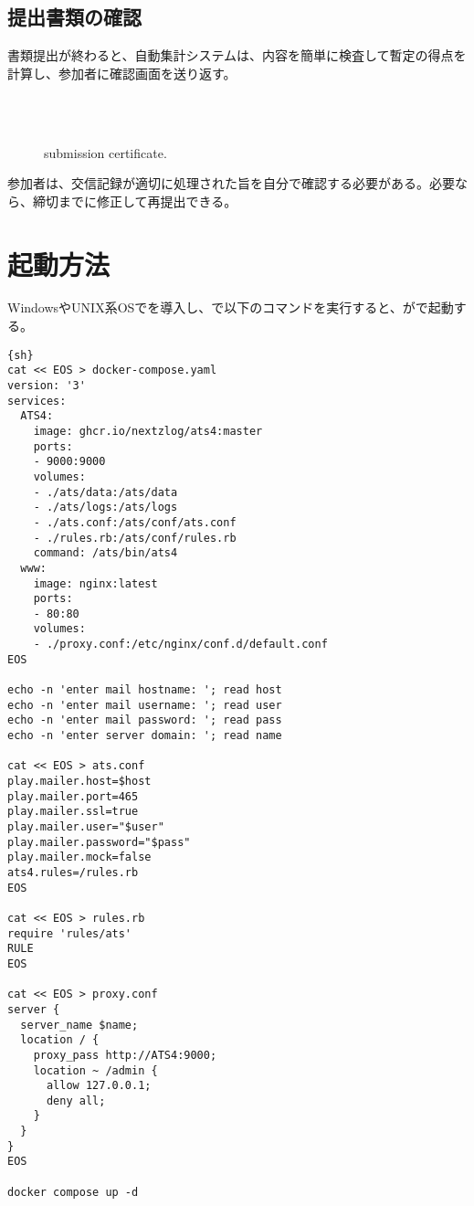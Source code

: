 \documentclass[10pt,a4paper]{book}
\begin{document}
\section{提出書類の確認}

書類提出が終わると、自動集計システムは、内容を簡単に検査して暫定の得点を計算し、参加者に確認画面を送り返す。

\begin{figure}[H]
\centering
{}\\
\\
\caption{submission certificate.}
\end{figure}

参加者は、交信記録が適切に処理された旨を自分で確認する必要がある。必要なら、締切までに修正して再提出できる。

\chapter{起動方法}

WindowsやUNIX系OSで\dock{}を導入し、\bash{}で以下のコマンドを実行すると、が\host{}で起動する。

\begin{Verbatim}{sh}
cat << EOS > docker-compose.yaml
version: '3'
services:
  ATS4:
    image: ghcr.io/nextzlog/ats4:master
    ports:
    - 9000:9000
    volumes:
    - ./ats/data:/ats/data
    - ./ats/logs:/ats/logs
    - ./ats.conf:/ats/conf/ats.conf
    - ./rules.rb:/ats/conf/rules.rb
    command: /ats/bin/ats4
  www:
    image: nginx:latest
    ports:
    - 80:80
    volumes:
    - ./proxy.conf:/etc/nginx/conf.d/default.conf
EOS

echo -n 'enter mail hostname: '; read host
echo -n 'enter mail username: '; read user
echo -n 'enter mail password: '; read pass
echo -n 'enter server domain: '; read name

cat << EOS > ats.conf
play.mailer.host=$host
play.mailer.port=465
play.mailer.ssl=true
play.mailer.user="$user"
play.mailer.password="$pass"
play.mailer.mock=false
ats4.rules=/rules.rb
EOS

cat << EOS > rules.rb
require 'rules/ats'
RULE
EOS

cat << EOS > proxy.conf
server {
  server_name $name;
  location / {
    proxy_pass http://ATS4:9000;
    location ~ /admin {
      allow 127.0.0.1;
      deny all;
    }
  }
}
EOS

docker compose up -d
\end{Verbatim}
\end{document}
